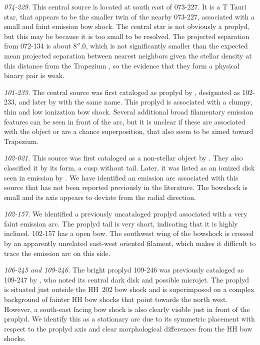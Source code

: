 \documentclass[apj, twocolumn]{aastex63}
\begin{document}
\textit{074-229.} This central source is located at south
east of 073-227. It is a T Tauri star, that appears to be
the smaller twin of the nearby 073-227, associated with a
small and faint emission bow shock. The central star is
not obviously a proplyd, but this may be because it is too
small to be resolved. The projected separation from 072-134
is about \(8''.0\), which is not significantly smaller than
the expected mean projected separation between nearest
neighbors given the stellar density at this distance from
the Trapezium \citep{Reipurth:2007a}, 
so the evidence that they form a physical binary pair is weak.

\textit{101-233.} The central source was first cataloged
as proplyd by \citet{ODell:1996a}, designated as 102-233,
and later by \citet{Ricci:2008a} with the same name. This
proplyd is associated with a clumpy, thin and low ionization
bow shock. Several additional broad filamentary emission
features can be seen in front of the arc, but it is unclear
if these are associated with the object or are a chance
superposition, that also seem to be aimed toward Trapezium. 

\textit{102-021.} This source was first cataloged as a non-stellar
object by \citet{ODell:1996a}. They also classified it by its form,
a cusp without tail. Later, it was listed as an ionized disk seen
in emission by \citet{Ricci:2008a}. We have identified an emission
arc associated with this source that has not been reported previously
in the literature. The  bowshock is small and its axis appears to
deviate from the radial direction. 

\textit{102-157.} We identified a previously uncataloged
proplyd associated with a very faint emission arc. The proplyd
tail is very short, indicating that it is highly inclined.
102-157 has a open bow. The southwest wing of the bowshock
is crossed by an apparently unrelated east-west oriented
filament, which makes it difficult to trace the emission
arc on this side.


\textit{106-245 and 109-246.} The bright proplyd 109-246
\citep{Ricci:2008a} was previously cataloged as 109-247 by
\citet{Bally:2000a}, who noted its central dark disk and
possible microjet.  The proplyd is situated just outside
the HH~202 bow shock and is superimposed on a complex
background of fainter HH bow shocks that point towards
the north west.  However, a south-east facing bow shock
is also clearly visible just in front of
the proplyd.  We identify this as a stationary arc due to its
symmetric placement with respect to the proplyd axis and clear
morphological differences from the HH bow shocks.
\end{document}
